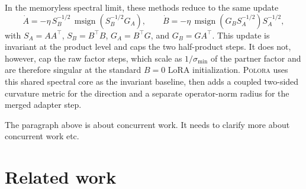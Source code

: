 \documentclass[11pt]{article}
\DeclareMathOperator{\polar}{msign}          %
\newcommand{\methodname}{\textsc{Polora}\xspace}
\theoremstyle{plain}
\theoremstyle{definition}
\theoremstyle{remark}
\begin{document}
In the memoryless spectral limit, these methods reduce to the same update
\[
  \dot A
  =
  -\eta\,S_B^{-1/2}\,
  \polar\!\left(S_B^{-1/2}G_A\right),
  \qquad
  \dot B
  =
  -\eta\,
  \polar\!\left(G_BS_A^{-1/2}\right)S_A^{-1/2},
\]
with $S_A=AA^\top$, $S_B=B^\top B$, $G_A=B^\top G$, and
$G_B=GA^\top$.  This update is invariant at the product level and caps
the two half-product steps.  It does not, however, cap the raw factor
steps, which scale as $1/\sigma_{\min}$ of the partner factor and are
therefore singular at the standard $B=0$ LoRA initialization.
\methodname{} uses this shared spectral core as the invariant baseline,
then adds a coupled two-sided curvature metric for the direction and a
separate operator-norm radius for the merged adapter step.

{\color{blue} The paragraph above is about concurrent work.
It needs to clarify more about concurrent work etc.
}


\section{Related work}
\label{sec:related}
\end{document}
